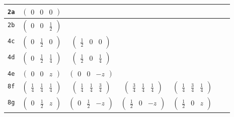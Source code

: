 \documentclass[fleqn,9pt,landscape]{jsarticle}
\begin{document}
\begin{center}
\begin{longtable}{ccccccc}
{\tt 2a} & $ \begin{pmatrix} 0 & 0 & 0 \end{pmatrix} $ & $  $ & $  $ & $  $ & $  $ & $  $ \\ \hline
{\tt 2b} & $ \begin{pmatrix} 0 & 0 & \frac{1}{2} \end{pmatrix} $ & $  $ & $  $ & $  $ & $  $ & $  $ \\ \hline
{\tt 4c} & $ \begin{pmatrix} 0 & \frac{1}{2} & 0 \end{pmatrix} $ & $ \begin{pmatrix} \frac{1}{2} & 0 & 0 \end{pmatrix} $ & $  $ & $  $ & $  $ & $  $ \\ \hline
{\tt 4d} & $ \begin{pmatrix} 0 & \frac{1}{2} & \frac{1}{4} \end{pmatrix} $ & $ \begin{pmatrix} \frac{1}{2} & 0 & \frac{1}{4} \end{pmatrix} $ & $  $ & $  $ & $  $ & $  $ \\ \hline
{\tt 4e} & $ \begin{pmatrix} 0 & 0 & z \end{pmatrix} $ & $ \begin{pmatrix} 0 & 0 & - z \end{pmatrix} $ & $  $ & $  $ & $  $ & $  $ \\ \hline
{\tt 8f} & $ \begin{pmatrix} \frac{1}{4} & \frac{1}{4} & \frac{1}{4} \end{pmatrix} $ & $ \begin{pmatrix} \frac{1}{4} & \frac{1}{4} & \frac{3}{4} \end{pmatrix} $ & $ \begin{pmatrix} \frac{3}{4} & \frac{1}{4} & \frac{1}{4} \end{pmatrix} $ & $ \begin{pmatrix} \frac{1}{4} & \frac{3}{4} & \frac{1}{4} \end{pmatrix} $ & $  $ & $  $ \\ \hline
{\tt 8g} & $ \begin{pmatrix} 0 & \frac{1}{2} & z \end{pmatrix} $ & $ \begin{pmatrix} 0 & \frac{1}{2} & - z \end{pmatrix} $ & $ \begin{pmatrix} \frac{1}{2} & 0 & - z \end{pmatrix} $ & $ \begin{pmatrix} \frac{1}{2} & 0 & z \end{pmatrix} $ & $  $ & $  $ \\ \hline

\end{longtable}
\end{center}
\end{document}
